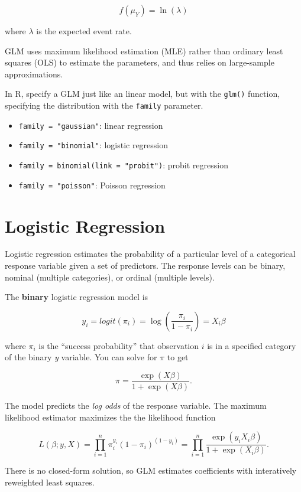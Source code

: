 \documentclass[
]{book}
\providecommand{\tightlist}{%
  \setlength{\itemsep}{0pt}\setlength{\parskip}{0pt}}
\begin{document}
\[f(\mu_Y) = \ln(\lambda)\]

where \(\lambda\) is the expected event rate.

GLM uses maximum likelihood estimation (MLE) rather than ordinary least squares (OLS) to estimate the parameters, and thus relies on large-sample approximations.

In R, specify a GLM just like an linear model, but with the \texttt{glm()} function, specifying the distribution with the \texttt{family} parameter.

\begin{itemize}
\tightlist
\item
  \texttt{family\ =\ "gaussian"}: linear regression
\item
  \texttt{family\ =\ "binomial"}: logistic regression
\item
  \texttt{family\ =\ binomial(link\ =\ "probit")}: probit regression
\item
  \texttt{family\ =\ "poisson"}: Poisson regression
\end{itemize}

\hypertarget{logistic-regression}{%
\section{Logistic Regression}\label{logistic-regression}}

Logistic regression estimates the probability of a particular level of a categorical response variable given a set of predictors. The response levels can be binary, nominal (multiple categories), or ordinal (multiple levels).

The \textbf{binary} logistic regression model is

\[y_i = logit(\pi_i) = \log\left(\frac{\pi_i}{1-\pi_i}\right) = X_i\beta\]

where \(\pi_i\) is the ``success probability'' that observation \(i\) is in a specified category of the binary \emph{y} variable. You can solve for \(\pi\) to get

\[\pi = \frac{\exp(X \beta)}{1 + \exp(X \beta)}.\]

The model predicts the \emph{log odds} of the response variable. The maximum likelihood estimator maximizes the the likelihood function

\[L(\beta; y, X) = \prod_{i=1}^n \pi_i^{y_i}(1 - \pi_i)^{(1-y_i)} = \prod_{i=1}^n\frac{\exp(y_i X_i \beta)}{1 + \exp(X_i \beta)}.\]

There is no closed-form solution, so GLM estimates coefficients with interatively reweighted least squares.
\end{document}
